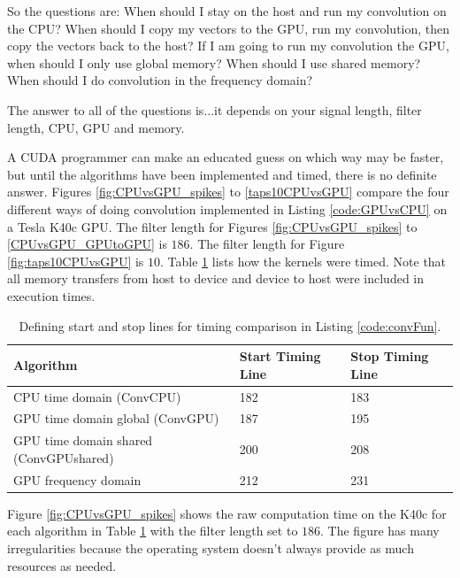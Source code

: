 So the questions are:
When should I stay on the host and run my convolution on the CPU?
When should I copy my vectors to the GPU, run my convolution, then copy the vectors back to the host?
If I am going to run my convolution the GPU, when should I only use global memory?
When should I use shared memory?
When should I do convolution in the frequency domain?

The answer to all of the questions is...it depends on your signal length, filter length, CPU, GPU and memory.

A CUDA programmer can make an educated guess on which way may be faster, but until the algorithms have been implemented and timed, there is no definite answer.
Figures \ref{fig:CPUvsGPU_spikes} to \ref{taps10CPUvsGPU} compare the four different ways of doing convolution implemented in Listing \ref{code:GPUvsCPU} on a Tesla K40c GPU.
The filter length for Figures \ref{fig:CPUvsGPU_spikes} to \ref{CPUvsGPU_GPUtoGPU} is $186$.
The filter length for Figure \ref{fig:taps10CPUvsGPU} is $10$.
Table \ref{tab:CPUvsGPUtimingTable} lists how the kernels were timed.
Note that all memory transfers from host to device and device to host were included in execution times.
\begin{table}
\caption{Defining start and stop lines for timing comparison in Listing \ref{code:convFun}.}
\begin{center}
\begin{tabular}{lll}
	\toprule
	Algorithm 								& Start Timing Line	& Stop Timing Line	\\ \midrule
	CPU time domain (ConvCPU) 				& 182				& 183 				\\
	GPU time domain global (ConvGPU) 		& 187				& 195				\\
	GPU time domain shared (ConvGPUshared) 	& 200				& 208				\\
	GPU frequency domain 					& 212				& 231				\\ 
	\bottomrule
\end{tabular}
\end{center}
\label{tab:CPUvsGPUtimingTable}
\end{table}

Figure \ref{fig:CPUvsGPU_spikes} shows the raw computation time on the K40c for each algorithm in Table \ref{tab:CPUvsGPUtimingTable} with the filter length set to $186$.
The figure has many irregularities because the operating system doesn't always provide as much resources as needed.

